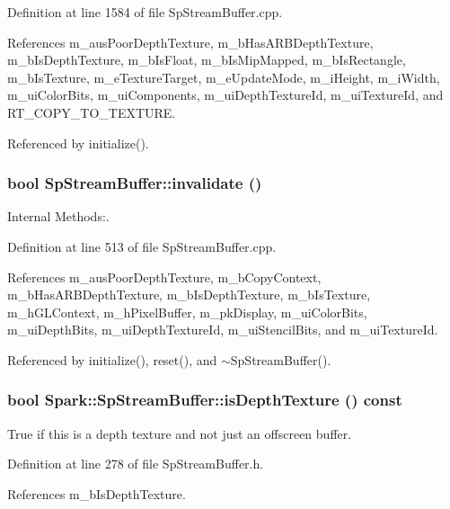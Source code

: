 Definition at line 1584 of file Sp\-Stream\-Buffer.cpp.

References m\_\-aus\-Poor\-Depth\-Texture, m\_\-b\-Has\-ARBDepth\-Texture, m\_\-b\-Is\-Depth\-Texture, m\_\-b\-Is\-Float, m\_\-b\-Is\-Mip\-Mapped, m\_\-b\-Is\-Rectangle, m\_\-b\-Is\-Texture, m\_\-e\-Texture\-Target, m\_\-e\-Update\-Mode, m\_\-i\-Height, m\_\-i\-Width, m\_\-ui\-Color\-Bits, m\_\-ui\-Components, m\_\-ui\-Depth\-Texture\-Id, m\_\-ui\-Texture\-Id, and RT\_\-COPY\_\-TO\_\-TEXTURE.

Referenced by initialize().
\subsubsection{\setlength{\rightskip}{0pt plus 5cm}bool Sp\-Stream\-Buffer::invalidate ()\hspace{0.3cm}{\tt  [protected]}}\label{classSpark_1_1SpStreamBuffer_b0}


Internal Methods:. 

Definition at line 513 of file Sp\-Stream\-Buffer.cpp.

References m\_\-aus\-Poor\-Depth\-Texture, m\_\-b\-Copy\-Context, m\_\-b\-Has\-ARBDepth\-Texture, m\_\-b\-Is\-Depth\-Texture, m\_\-b\-Is\-Texture, m\_\-h\-GLContext, m\_\-h\-Pixel\-Buffer, m\_\-pk\-Display, m\_\-ui\-Color\-Bits, m\_\-ui\-Depth\-Bits, m\_\-ui\-Depth\-Texture\-Id, m\_\-ui\-Stencil\-Bits, and m\_\-ui\-Texture\-Id.

Referenced by initialize(), reset(), and $\sim$Sp\-Stream\-Buffer().
\subsubsection{\setlength{\rightskip}{0pt plus 5cm}bool Spark::Sp\-Stream\-Buffer::is\-Depth\-Texture () const\hspace{0.3cm}{\tt  [inline]}}\label{classSpark_1_1SpStreamBuffer_a32}


True if this is a depth texture and not just an offscreen buffer. 

Definition at line 278 of file Sp\-Stream\-Buffer.h.

References m\_\-b\-Is\-Depth\-Texture.

